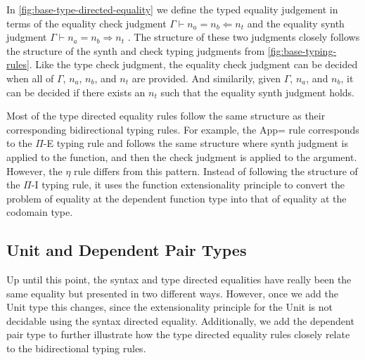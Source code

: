 \documentclass{article}
\newcommand{\chkEqJ}[4]{#1 \vdash #2 = #3 \Leftarrow #4}
\newcommand{\synEqJ}[4]{#1 \vdash #2 = #3 \Rightarrow #4}
\begin{document}
In \autoref{fig:base-type-directed-equality} we define the typed equality judgement in terms of the equality check judgment $\chkEqJ{\Gamma}{n_a}{n_b}{n_t}$ and the equality synth judgment $\synEqJ{\Gamma}{n_a}{n_b}{n_t}$ .
The structure of these two judgments closely follows the structure of the synth and check typing judgments from \autoref{fig:base-typing-rules}.
Like the type check judgment, the equality check judgment can be decided when all of $\Gamma$, $n_a$, $n_b$, and $n_t$ are provided.
And similarily, given $\Gamma$, $n_a$, and $n_b$, it can be decided if there exists an $n_t$ such that the equality synth judgment holds.

Most of the type directed equality rules follow the same structure as their corresponding bidirectional typing rules.
For example, the App= rule corresponds to the $\Pi$-E typing rule and follows the same structure where synth judgment is applied to the function, and then the check judgment is applied to the argument.
However, the $\eta$ rule differs from this pattern.
Instead of following the structure of the $\Pi$-I typing rule, it uses the function extensionality principle to convert the problem of equality at the dependent function type into that of equality at the codomain type.

\subsection{Unit and Dependent Pair Types}

Up until this point, the syntax and type directed equalities have really been the same equality but presented in two different ways.
However, once we add the Unit type this changes, since the extensionality principle for the Unit is not decidable using the syntax directed equality.
Additionally, we add the dependent pair type to further illustrate how the type directed equality rules closely relate to the bidirectional typing rules.
\end{document}
